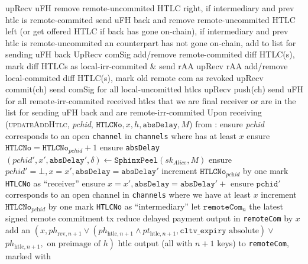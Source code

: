 \begin{algorithmic}[1]
    \State upRecv uFH remove remote-uncommited HTLC right, if intermediary and
    prev htlc is remote-commited send uFH back and remove remote-uncommited HTLC
    left (or get offered HTLC if back has gone on-chain), if intermediary and
    prev htlc is remote-uncommited an counterpart has not gone on-chain, add to
    list for sending uFH back
    \State UpRecv comSig add/remove remote-commited diff HTLC(s), mark diff
    HTLCs as local-irr-commited \& send rAA
    \State upRecv rAA add/remove local-commited diff HTLC(s), mark old remote
    com as revoked
    \State upRecv commit(ch) send comSig for all local-uncomitted htlcs
    \State upRecv push(ch) send uFH for all remote-irr-commited received htlcs
    that we are final receiver or are in the list for sending uFH back and are
    remote-irr-commited
    \State Upon receiving (\textsc{updateAddHtlc}, \textit{pchid},
    $\mathtt{HTLCNo}, x, h, \mathtt{absDelay}, M$) from \bob:
    \Indent
      \State ensure \textit{pchid} corresponds to an open \texttt{channel} in
      \texttt{channels} where \bob{} has at least $x$
      \State ensure $\mathtt{HTLCNo} = \mathtt{HTLCNo}_{\mathit{pchid}} + 1$
      \State ensure \texttt{absDelay} 
      \State $\left(\mathit{pchid}', x', \mathtt{absDelay}', \delta\right) \gets
      \mathtt{SphinxPeel}\left(sk_{\textit{Alice}}, M\right)$
        \State ensure $\mathit{pchid}' = \bot, x = x', \mathtt{absDelay} =
        \mathtt{absDelay}'$
        \State increment $\mathtt{HTLCNo}_{\textit{pchid}}$ by one
        \State mark \texttt{HTLCNo} as ``receiver''
      \Else {}
        \State ensure $x = x', \mathtt{absDelay} = \mathtt{absDelay}' +$
        \State ensure $\mathtt{pchid}'$ corresponds to an open channel in
        \texttt{channels} where we have at least $x$
        \State increment $\mathtt{HTLCNo}_{\textit{pchid}}$ by one
        \State mark \texttt{HTLCNo} as ``intermediary''
      \EndIf
      \State let $\mathtt{remoteCom}_n$ the latest signed remote commitment tx
      \State reduce delayed payment output in \texttt{remoteCom} by $x$
      \State add an $\left(x, ph_{\mathrm{rev}, n+1} \vee
      \left(ph_{\mathrm{htlc}, n+1} \wedge pt_{\mathrm{htlc}, n+1},
      \mathtt{cltv\_expiry} \text{ absolute}\right) \vee\right.$
      $\left.ph_{\mathrm{htlc}, n+1}, \text{ on preimage of } h\right)$ htlc
       
      output (all with $n+1$ keys) to \texttt{remoteCom}, marked with

\end{algorithmic}
